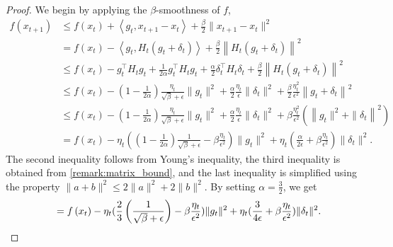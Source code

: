 \begin{proof}
    We begin by applying the $\beta$-smoothness of $f$, 
    \begin{align*} 
        f(x_{t+1}) & \leq f(x_t) + \left\langle g_t, x_{t+1} - x_t \right\rangle + \frac{\beta}{2} \|x_{t+1} - x_t\|^2\\
        & =f\left(x_t\right)-\left\langle g_t, H_t (g_t+\delta_t)\right\rangle+\frac{\beta}{2}\left\|H_t (g_t+\delta_t)\right\|^2 \\
        & \leq f\left(x_t\right)- g_t^\top H_tg_t 
        + \frac{1}{2\alpha} g_t^\top H_t g_t + \frac{\alpha}{2} \delta_t^\top H_t \delta_t
        +\frac{\beta}{2}\left\|H_t (g_t+\delta_t)\right\|^2\\
        & \leq f\left(x_t\right)-(1-\frac{1}{2\alpha})  \frac{\eta_t}{\sqrt{\beta}+\epsilon} \|g_t\|^2  +\frac{\alpha}{2} \frac{\eta_t}{\epsilon} \|\delta_t\|^2 +\frac{\beta}{2}\frac{\eta_t^2}{\epsilon^2}\left\|g_t+\delta_t\right\|^2 \\
        & \leq f\left(x_t\right)-(1-\frac{1}{2\alpha})  \frac{\eta_t}{\sqrt{\beta}+\epsilon} \|g_t\|^2  +\frac{\alpha}{2} \frac{\eta_t}{\epsilon} \|\delta_t\|^2 +\beta\frac{\eta_t^2}{\epsilon^2}(\left\|g_t\|^2+\|\delta_t\right\|^2) \\
        & = f\left(x_t\right)-\eta_t((1-\frac{1}{2\alpha})\frac{1}{\sqrt{\beta}+\epsilon}-\beta\frac{\eta_t}{\epsilon^2}) \|g_t\|^2  +\eta_t(\frac{\alpha}{2\epsilon} + \beta\frac{\eta_t}{\epsilon^2})\|\delta_t\|^2.
\end{align*}
The second inequality follows from Young's inequality, the third inequality is obtained from \cref{remark:matrix_bound}, and the last inequality is simplified using the property \( \|a + b\|^2 \leq 2\|a\|^2 + 2\|b\|^2 \). By setting \( \alpha = \frac{3}{2} \), we get
\begin{align*}
        \hspace{3.5mm}= f\left(x_t\right)-\eta_t(\frac{2}{3}\left(\frac{1}{\sqrt{\beta}+\epsilon}\right)-\beta\frac{\eta_t}{\epsilon^2}) \|g_t\|^2  +\eta_t(\frac{3}{4\epsilon} + \beta\frac{\eta_t}{\epsilon^2})\|\delta_t\|^2.

\end{align*}
\end{proof}
